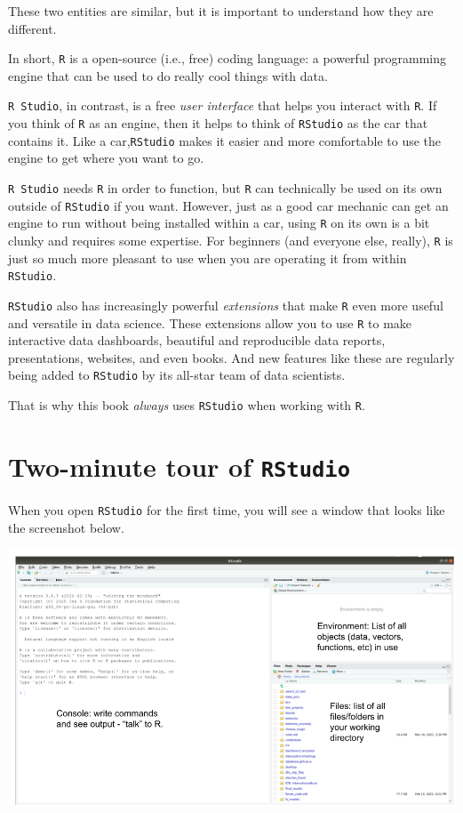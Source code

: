 \documentclass[
]{book}
\begin{document}
These two entities are similar, but it is important to understand how they are different.

In short, \texttt{R} is a open-source (i.e., free) coding language: a powerful programming engine that can be used to do really cool things with data.

\texttt{R\ Studio}, in contrast, is a free \emph{user interface} that helps you interact with \texttt{R}. If you think of \texttt{R} as an engine, then it helps to think of \texttt{RStudio} as the car that contains it. Like a car,\texttt{RStudio} makes it easier and more comfortable to use the engine to get where you want to go.

\texttt{R\ Studio} needs \texttt{R} in order to function, but \texttt{R} can technically be used on its own outside of \texttt{RStudio} if you want. However, just as a good car mechanic can get an engine to run without being installed within a car, using \texttt{R} on its own is a bit clunky and requires some expertise. For beginners (and everyone else, really), \texttt{R} is just so much more pleasant to use when you are operating it from within \texttt{RStudio}.

\texttt{RStudio} also has increasingly powerful \emph{extensions} that make \texttt{R} even more useful and versatile in data science. These extensions allow you to use \texttt{R} to make interactive data dashboards, beautiful and reproducible data reports, presentations, websites, and even books. And new features like these are regularly being added to \texttt{RStudio} by its all-star team of data scientists.

That is why this book \emph{always} uses \texttt{RStudio} when working with \texttt{R}.

\hypertarget{two-minute-tour-of-rstudio}{%
\section*{\texorpdfstring{Two-minute tour of \texttt{RStudio}}{Two-minute tour of RStudio}}\label{two-minute-tour-of-rstudio}}

When you open \texttt{RStudio} for the first time, you will see a window that looks like the screenshot below.

\includegraphics{img/rstudio_windows.png}
\end{document}

